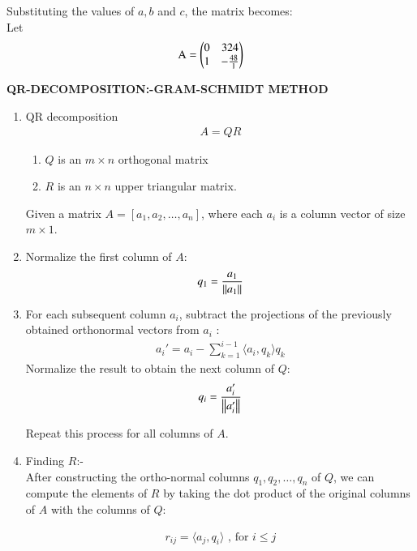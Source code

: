 \documentclass[article]{IEEEtran}
\numberwithin{figure}{enumi}
\begin{document}
Substituting the values of $a,b$ and $c$, the matrix becomes:\\
Let
\begin{align}
\text{A} =
\begin{pmatrix}0 & 324 \\
1 & -\frac{48}{1}
\end{pmatrix}
\end{align}




\textbf{QR-DECOMPOSITION:-GRAM-SCHMIDT METHOD}\\



\begin{enumerate}

\item QR decomposition 
\begin{align}
A = QR
\end{align}
\begin{enumerate}
    \item $Q$ is an $ m \times n $ orthogonal matrix
    \item $R$ is an $n \times n$ upper triangular matrix.
\end{enumerate}
Given a matrix $ A = [a_1, a_2, \dots, a_n] $, where each $ a_i $ is a column vector of size $ m \times 1 $.

\item Normalize the first column of $A$:
\begin{align}
q_1 = \frac{a_1}{\left\lVert a_1\right\rVert}
\end{align}

\item  For each subsequent column $ a_i $, subtract the projections of the previously obtained orthonormal vectors from $ a_i $ :
\begin{align}
a_i' = a_i - \sum_{k=1}^{i-1} \langle a_i, q_k \rangle q_k
\end{align}
Normalize the result to obtain the next column of \( Q \):
\begin{align}
q_i = \frac{a_i'}{\left\lVert a_i'\right\rVert}
\end{align}

Repeat this process for all columns of \( A \).

\item Finding $R$:- \\
After constructing the ortho-normal columns $ q_1, q_2, \dots, q_n $ of $Q$, we can compute the elements of $R$ by taking the dot product of the original columns of $A$ with the columns of $Q$:

\begin{align}
    r_{ij} = \langle a_j, q_i \rangle \text{ , for  }  i \leq j 
\end{align}
\end{enumerate}
\end{document}
